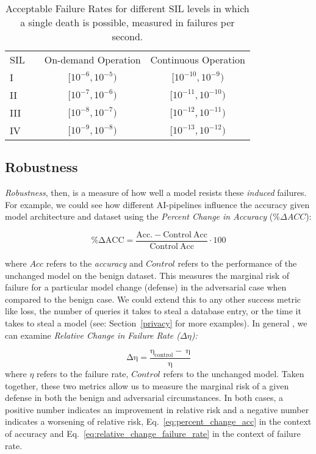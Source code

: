 \documentclass[conference]{IEEEtran}
\begin{document}
\begin{table}[!ht]
    \begin{center}
        \caption{Acceptable Failure Rates for different SIL levels in which a single death is possible, measured in failures per second.}
        \begin{tabular}{l c cc}
            \toprule
            SIL  && On-demand Operation   & Continuous Operation \\
            \cmidrule{1-1} \cmidrule{3-4}
            I     && $[10^{-6}, 10^{-5})$  & $[10^{-10}, 10^{-9})$ \\
            II    && $[10^{-7}, 10^{-6})$  & $[10^{-11}, 10^{-10})$ \\
            III   && $[10^{-8}, 10^{-7})$  & $[10^{-12}, 10^{-11})$ \\
            IV    && $[10^{-9}, 10^{-8})$  & $[10^{-13}, 10^{-12})$ \\
            \bottomrule
        \end{tabular}
        \label{tab:rate}
    \end{center}
\end{table} 


\subsection{Robustness}
\textit{Robustness}, then, is a measure of how well a model resists these \textit{induced} failures. For example, we could see how different AI-pipelines influence the accuracy given model architecture and dataset using the \textit{Percent Change in Accuracy} ($\%\Delta ACC$):

\begin{equation}
    \label{eq:percent_change_acc}
    \mathrm{\%\Delta ACC = 
        \frac{Acc.-Control~Acc}{Control~Acc}} \cdot 100
\end{equation}

where $Acc$ refers to the \textit{accuracy} and $Control$ refers to the performance of the unchanged model on the benign dataset. This measures the marginal risk of failure for a particular model change (defense) in the adversarial case when compared to the benign case. We could extend this to any other success metric like loss, the number of queries it takes to steal a database entry, or the time it takes to steal a model (see: Section~\ref{privacy} for more examples). In general \cite{meyers_1}, we can examine \textit{Relative Change in Failure Rate ($ \Delta \eta$):}

\begin{equation}
\label{eq:relative_change_failure_rate}
\mathrm{\Delta \eta} = 
    \frac{\mathrm{\eta_{control}-~\eta}}{\mathrm{\eta}}
\end{equation}
where $\eta$ refers to the failure rate, $Control$ refers to the unchanged model. Taken together, these two metrics allow us to measure the marginal risk of a given defense in both the benign and adversarial circumstances. In both cases, a positive number indicates an improvement in relative risk and a negative number indicates a worsening of relative risk, Eq.~\ref{eq:percent_change_acc} in the context of accuracy and Eq.~\ref{eq:relative_change_failure_rate} in the context of failure rate.
\end{document}
